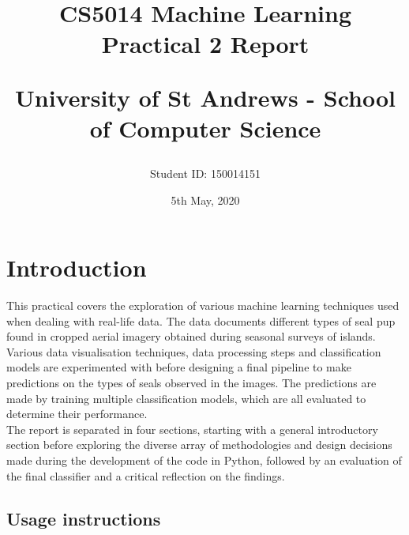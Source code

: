 \documentclass[letterpaper,12pt]{article}
\begin{document}
\title{
    CS5014 Machine Learning\\Practical 2 Report\\
    \begin{large}
    University of St Andrews - School of Computer Science
    \end{large}
}
\author{Student ID: 150014151}
\date{5th May, 2020}
\maketitle
\newpage

\tableofcontents
\newpage


\section{Introduction}
\label{sec:introduction}

This practical covers the exploration of various machine learning techniques used when dealing with real-life data. The data documents different types of seal pup found in cropped aerial imagery obtained during seasonal surveys of islands. Various data visualisation techniques, data processing steps and classification models are experimented with before designing a final pipeline to make predictions on the types of seals observed in the images. The predictions are made by training multiple classification models, which are all evaluated to determine their performance.\\

The report is separated in four sections, starting with a general introductory section before exploring the diverse array of methodologies and design decisions made during the development of the code in Python, followed by an evaluation of the final classifier and a critical reflection on the findings.

\subsection{Usage instructions}
\end{document}
